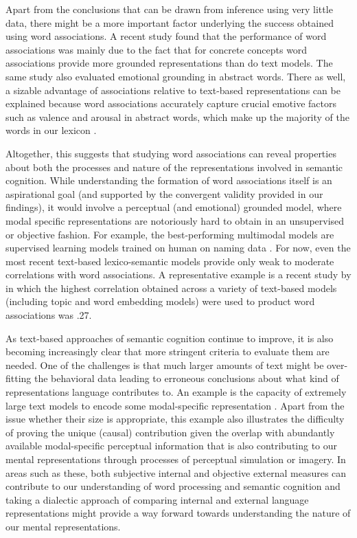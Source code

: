 \documentclass[a4paper,doc,natbib,floatsintext]{apa6}
\begin{document}
Apart from the conclusions that can be drawn from inference using very little data, there might be a more important factor underlying the success obtained using word associations. A recent study found that the performance of word associations was mainly due to the fact that for concrete concepts word associations provide more grounded representations than do text models. The same study also evaluated emotional grounding in abstract words. There as well, a sizable advantage of associations relative to text-based representations can be explained because word associations accurately capture crucial emotive factors such as valence and arousal in abstract words, which make up the majority of the words in our lexicon \citep{DeDeyne2018VISEMO}.

Altogether, this suggests that studying word associations can reveal properties about both the processes and nature of the representations involved in semantic cognition.
While understanding the formation of word associations itself is an aspirational goal (and supported by the convergent validity provided in our findings), it would involve a perceptual (and emotional) grounded model, where modal specific representations are notoriously hard to obtain in an unsupervised or objective fashion. For example, the best-performing multimodal models are supervised learning models trained on human on naming data \citep[e.g.,][]{Bruni2014JAIR,Silberer2014}.  For now, even the most recent text-based lexico-semantic models provide only weak to moderate correlations with word associations. A representative example is a recent study by \citet{Nematzadeh2017} in which the highest correlation obtained across a variety of text-based models (including topic and word embedding models) were used to product word associations was .27.

As text-based approaches of semantic cognition continue to improve, it is also becoming increasingly clear that more stringent criteria to evaluate them are needed.
One of the challenges is that much larger amounts of text might be over-fitting the behavioral data  leading to erroneous conclusions about what kind of representations language contributes to. An example is the capacity of extremely large text models to encode some modal-specific representation \citep{Louwerse2011TiCS}. Apart from the issue whether their size is appropriate, this example also illustrates the difficulty of proving the unique (causal) contribution given the overlap with abundantly available modal-specific perceptual information that is also contributing to our mental representations through processes of perceptual simulation or imagery. In areas such as these, both subjective internal and objective external measures can contribute to our understanding of word processing and semantic cognition and taking a dialectic approach of comparing internal and external language representations might provide a way forward towards understanding the nature of our mental representations.
\end{document}
